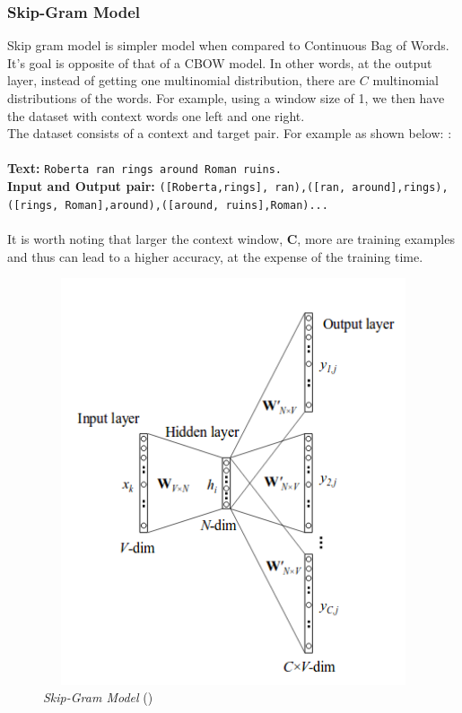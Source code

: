 \subsubsection{Skip-Gram Model} 
Skip gram model is simpler model when compared to Continuous Bag of Words. It's goal is opposite of that of a CBOW model. In other words, at the output layer, instead of getting one multinomial distribution, there are $C$ multinomial distributions of the words. For example, using a window size of 1, we then have the dataset with context words one left and one right.\\
The dataset consists of a context and target pair. For example as shown below: \cite{tensorflow2015-whitepaper}:\\\\
\textbf{Text:} 
\texttt{Roberta ran rings around Roman ruins.}\\
\textbf{Input and Output pair:}
\texttt{([Roberta,rings], ran),([ran, around],rings), ([rings, Roman],around),([around, ruins],Roman)...}
\\\\
It is worth noting that larger the context window, \textbf{C}, more are training examples and thus can lead to a higher accuracy, at the expense of the training time.\\
\begin{figure}[H]
	\centering
	\includegraphics[width=15cm,height=12cm,keepaspectratio]{files/skip-gram.png}
	\caption{\textit{Skip-Gram Model} (\cite{DBLP:journals/corr/Rong14})}
	\label{fig:skip_sg}
\end{figure}
